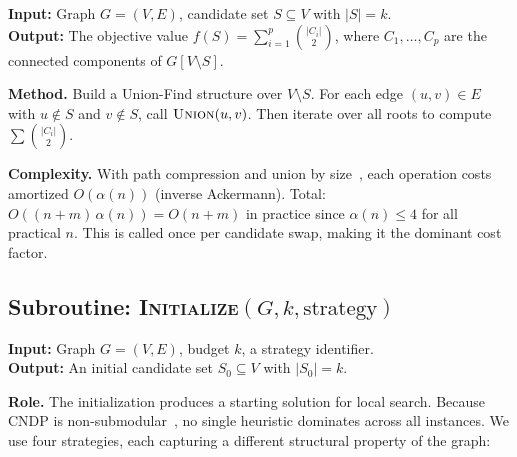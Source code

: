 \documentclass[11pt,a4paper]{article}
\begin{document}
\textbf{Input:} Graph $G = (V, E)$, candidate set $S \subseteq V$ with $|S| = k$.\\
\textbf{Output:} The objective value $f(S) = \sum_{i=1}^{p} \binom{|C_i|}{2}$, where $C_1, \ldots, C_p$ are the connected components of $G[V \setminus S]$.

\textbf{Method.} Build a Union-Find structure over $V \setminus S$. For each edge $(u,v) \in E$ with $u \notin S$ and $v \notin S$, call $\textsc{Union}(u, v)$. Then iterate over all roots to compute $\sum \binom{|C_i|}{2}$.

\textbf{Complexity.} With path compression and union by size~\cite{tarjan1975}, each operation costs amortized $O(\alpha(n))$ (inverse Ackermann). Total: $O((n + m)\,\alpha(n)) = O(n + m)$ in practice since $\alpha(n) \leq 4$ for all practical $n$. This is called once per candidate swap, making it the dominant cost factor.

\subsection{Subroutine: \textsc{Initialize}$(G, k, \text{strategy})$}

\textbf{Input:} Graph $G = (V, E)$, budget $k$, a strategy identifier.\\
\textbf{Output:} An initial candidate set $S_0 \subseteq V$ with $|S_0| = k$.

\textbf{Role.} The initialization produces a starting solution for local search. Because CNDP is non-submodular~\cite{nemhauser1978}, no single heuristic dominates across all instances. We use four strategies, each capturing a different structural property of the graph:
\end{document}

